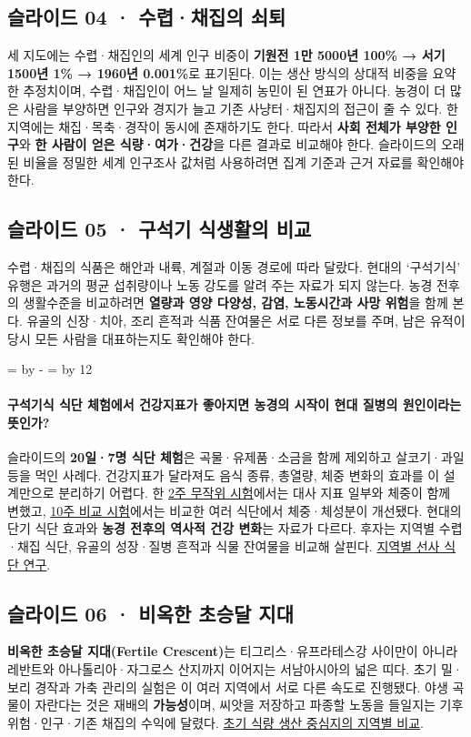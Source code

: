 \documentclass[10pt,a4paper]{article}
\newcommand{\ReserveQuestionSpace}{%
  \par\begingroup
  \dimen0=\pagegoal \advance\dimen0 by -\pagetotal
  \dimen2=\baselineskip \multiply\dimen2 by 12
  \ifdim\dimen0<\dimen2 \newpage\fi
  \endgroup}
\begin{document}
\subsection{슬라이드 04 · 수렵·채집의 쇠퇴}
세 지도에는 수렵·채집인의 세계 인구 비중이 \textbf{기원전 1만 5000년 100\% → 서기 1500년 1\% → 1960년 0.001\%}로 표기된다. 이는 생산 방식의 상대적 비중을 요약한 추정치이며, 수렵·채집인이 어느 날 일제히 농민이 된 연표가 아니다. 농경이 더 많은 사람을 부양하면 인구와 경지가 늘고 기존 사냥터·채집지의 접근이 줄 수 있다. 한 지역에는 채집·목축·경작이 동시에 존재하기도 한다. 따라서 \textbf{사회 전체가 부양한 인구}와 \textbf{한 사람이 얻은 식량·여가·건강}을 다른 결과로 비교해야 한다. 슬라이드의 오래된 비율을 정밀한 세계 인구조사 값처럼 사용하려면 집계 기준과 근거 자료를 확인해야 한다.\par

\subsection{슬라이드 05 · 구석기 식생활의 비교}
수렵·채집의 식품은 해안과 내륙, 계절과 이동 경로에 따라 달랐다. 현대의 ‘구석기식’ 유행은 과거의 평균 섭취량이나 노동 강도를 알려 주는 자료가 되지 않는다. 농경 전후의 생활수준을 비교하려면 \textbf{열량과 영양 다양성, 감염, 노동시간과 사망 위험}을 함께 본다. 유골의 신장·치아, 조리 흔적과 식품 잔여물은 서로 다른 정보를 주며, 남은 유적이 당시 모든 사람을 대표하는지도 확인해야 한다.\par

\ReserveQuestionSpace
\paragraph{구석기식 식단 체험에서 건강지표가 좋아지면 농경의 시작이 현대 질병의 원인이라는 뜻인가?}
슬라이드의 \textbf{20일·7명 식단 체험}은 곡물·유제품·소금을 함께 제외하고 살코기·과일 등을 먹인 사례다. 건강지표가 달라져도 음식 종류, 총열량, 체중 변화의 효과를 이 설계만으로 분리하기 어렵다. 한 \href{https://pubmed.ncbi.nlm.nih.gov/25304296/}{2주 무작위 시험}에서는 대사 지표 일부와 체중이 함께 변했고, \href{https://pubmed.ncbi.nlm.nih.gov/35331539/}{10주 비교 시험}에서는 비교한 여러 식단에서 체중·체성분이 개선됐다. 현대의 단기 식단 효과와 \textbf{농경 전후의 역사적 건강 변화}는 자료가 다르다. 후자는 지역별 수렵·채집 식단, 유골의 성장·질병 흔적과 식물 잔여물을 비교해 살핀다. \href{https://www.nature.com/articles/s41598-018-19409-8}{지역별 선사 식단 연구}.\par

\subsection{슬라이드 06 · 비옥한 초승달 지대}
\textbf{비옥한 초승달 지대(Fertile Crescent)}는 티그리스·유프라테스강 사이만이 아니라 레반트와 아나톨리아·자그로스 산지까지 이어지는 서남아시아의 넓은 띠다. 초기 밀·보리 경작과 가축 관리의 실험은 이 여러 지역에서 서로 다른 속도로 진행됐다. 야생 곡물이 자란다는 것은 재배의 \textbf{가능성}이며, 씨앗을 저장하고 파종할 노동을 들일지는 기후 위험·인구·기존 채집의 수익에 달렸다. \href{https://www.nature.com/articles/s41598-023-43549-1}{초기 식량 생산 중심지의 지역별 비교}.\par
\end{document}
